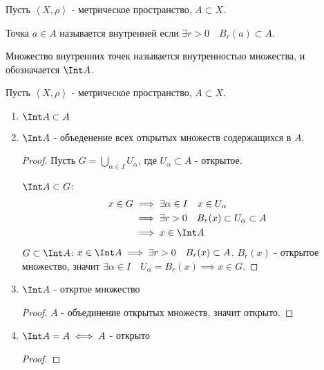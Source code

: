 
\begin{definition}[повтор] \thmslashn 

    Пусть $\left<X, \rho\right>$ - метрическое пространство, $A \subset X$.

    Точка $a\in A$ называется внутренней если $\exists{r > 0}\quad B_{r}(a) \subset A$.

    Множество внутренних точек называется внутренностью множества, и обозначается $\Int A$.
\end{definition}

\begin{properties} \thmslashn

    Пусть $\left<X, \rho\right>$ - метрическое пространство, $A \subset X$.

    \begin{enumerate}
        \item $\Int A \subset A$
        \item $\Int A$ - объеденение всех открытых множеств содержащихся в $A$.
            \begin{proof} \thmslashn
            
                Пусть $G = \bigcup\limits_{\alpha\in I} U_{\alpha}$, где $U_{\alpha} \subset A$ - открытое.

                $\Int A \subset G$:
                \begin{equation*}
                    \begin{split}
                        x\in G 
                        &\implies \exists{\alpha\in I}\quad x\in U_{\alpha}\\
                        &\implies \exists{r > 0}\quad B_{r}(x) \subset U_{\alpha} \subset A\\
                        &\implies x\in \Int A
                    \end{split}
                \end{equation*}
                $G \subset \Int A$:  $x\in \Int A \implies \exists{r > 0}\quad B_{r}(x) \subset A$. $B_{r}(x)$ - открытое множество, значит $\exists{\alpha\in I}\quad U_{\alpha} = B_{r}(x) \implies x\in G$.
            \end{proof}
        \item $\Int A$ - откртое множество
            \begin{proof} \thmslashn
            
                $A$ - объединение открытых множеств, значит открыто.
            \end{proof}
        \item $\Int A = A \iff A$ - открыто
            \begin{proof} \thmslashn
            

\end{proof}
\end{enumerate}
\end{properties}
